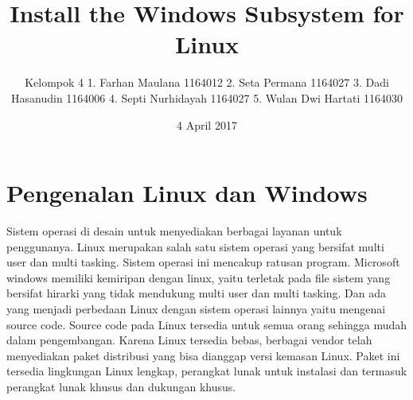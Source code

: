\documentclass{Install the Windows Subsystem for Linux}
\title{Install the Windows Subsystem for Linux \LaTex}
\author{Kelompok 4
1. Farhan Maulana       1164012
2. Seta Permana         1164027
3. Dadi Hasanudin       1164006
4. Septi Nurhidayah     1164027
5. Wulan Dwi Hartati    1164030}
\date{4 April 2017}
\begin{document}
\maketitle
\section{Pengenalan Linux dan Windows}
Sistem operasi di desain untuk menyediakan berbagai layanan untuk penggunanya. Linux merupakan salah satu sistem operasi yang bersifat multi user dan multi tasking. Sistem operasi ini mencakup ratusan program. Microsoft windows memiliki kemiripan dengan linux, yaitu terletak pada file sistem yang bersifat hirarki yang tidak mendukung multi user dan multi tasking.
Dan ada yang menjadi perbedaan Linux dengan sistem operasi lainnya yaitu mengenai source code. Source code pada Linux tersedia untuk semua orang sehingga mudah dalam pengembangan. Karena Linux tersedia bebas, berbagai vendor telah menyediakan paket distribusi yang bisa dianggap versi kemasan Linux. Paket ini tersedia lingkungan Linux lengkap, perangkat lunak untuk instalasi dan termasuk perangkat lunak khusus dan dukungan khusus.
\end{document}
